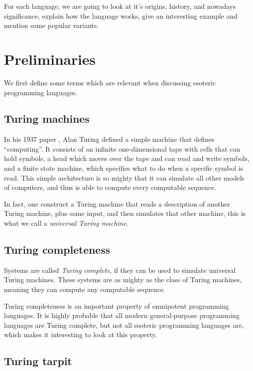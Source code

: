 \documentclass{sig-alternate}
\begin{document}
For each language, we are going to look at it's origins, history, and nowadays significance, explain how the language works, give an interesting example and mention some popular variants.

\section{Preliminaries}

We first define some terms which are relevant when discussing esoteric programming languages.

\subsection{Turing machines}

In his 1937 paper \cite{turing1937computable}, Alan Turing defined a simple machine that defines “computing”. It consists of an infinite one-dimensional tape with cells that can hold symbols, a head which moves over the tape and can read and write symbols, and a finite state machine, which specifies what to do when a specific symbol is read. This simple architecture is so mighty that it can simulate all other models of computers, and thus is able to compute every computable sequence.

In fact, one construct a Turing machine that reads a description of another Turing machine, plus some input, and then simulates that other machine, this is what we call a \emph{universal Turing machine}.

\subsection{Turing completeness}

Systems are called \emph{Turing complete}, if they can be used to simulate universal Turing machines. These systems are as mighty as the class of Turing machines, meaning they can compute any computable sequence.

Turing completeness is an important property of omnipotent programming languages. It is highly probable that all modern general-purpose programming languages are Turing complete, but not all esoteric programming languages are, which makes it interesting to look at this property.

\subsection{Turing tarpit}
\end{document}
